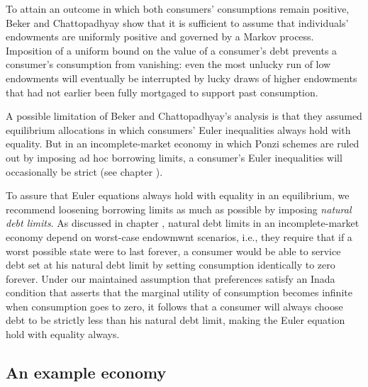 %
%

To attain an outcome in which both consumers' consumptions remain positive,
Beker and Chattopadhyay  show that it is sufficient to assume
that individuals' endowments are uniformly
positive and governed by a Markov process. Imposition  of a uniform bound on the
value of a consumer's debt prevents a
consumer's consumption from vanishing:  even the most unlucky  run of
low endowments will eventually be interrupted
by  lucky draws of higher endowments that
had not earlier been fully mortgaged to support past
consumption.

A possible limitation of  Beker and
Chattopadhyay's  analysis  is that they assumed equilibrium allocations in which 
consumers' Euler inequalities  
 always hold with equality. But   in
an incomplete-market economy  in which  Ponzi schemes
are ruled out by imposing ad hoc borrowing limits, a consumer's Euler inequalities 
will occasionally be  strict  (see chapter ).

To assure that Euler equations always hold with equality in  an
equilibrium, we recommend  loosening borrowing limits as much as possible by
imposing {\it natural debt limits}. As discussed in chapter
, natural debt limits in an incomplete-market
economy depend  on worst-case endowmwnt scenarios, i.e., they require  that  if
a worst possible state were to last forever, a consumer
would be able to  service  debt set at his
natural debt limit by setting  consumption identically to zero forever. Under
our maintained assumption that preferences satisfy an Inada
condition that asserts that the marginal utility of consumption becomes
infinite when consumption goes to zero, it follows that a consumer
will always choose debt to be  strictly less than
his natural debt limit, making the Euler equation
 hold with equality always.



\subsection{An example economy}

